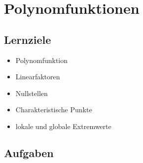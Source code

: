 
\section{Polynomfunktionen}

\subsection*{Lernziele}

\begin{itemize}
\item Polynomfunktion
\item Linearfaktoren
\item Nullstellen
\item Charakteristische Punkte
\item lokale und globale Extremwerte
\end{itemize}

\subsection*{Aufgaben}


\newpage

